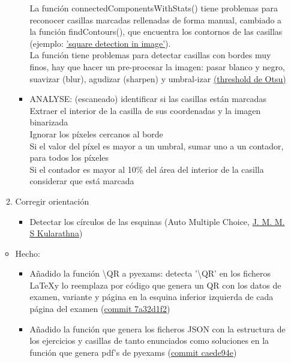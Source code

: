 \begin{itemize}
\begin{enumerate}
\begin{itemize}
            La función connectedComponentsWithStats() tiene problemas para reconocer casillas marcadas rellenadas de forma manual, cambiado a la función findContours(), que encuentra los contornos de las casillas (ejemplo: \href{https://stackoverflow.com/questions/55169645/square-detection-in-image}{'square detection in image'}). \\
            La función tiene problemas para detectar casillas con bordes muy finos, hay que hacer un pre-procesar la imagen: pasar blanco y negro, suavizar (blur), agudizar (sharpen) y umbral-izar \href{https://docs.opencv.org/4.x/d7/d4d/tutorial_py_thresholding.html}{(threshold de Otsu)}
            \item ANALYSE: (escaneado) identificar si las casillas están marcadas \\
            Extraer el interior de la casilla de sus coordenadas y la imagen binarizada \\
            Ignorar los píxeles cercanos al borde \\
            Si el valor del píxel es mayor a un umbral, sumar uno a un contador, para todos los píxeles \\
            Si el contador es mayor al 10\% del área del interior de la casilla considerar que está marcada
        \end{itemize}
        \item Corregir orientación
        \begin{itemize}
            \item Detectar los círculos de las esquinas (Auto Multiple Choice, \href{https://dl.ucsc.cmb.ac.lk/jspui/bitstream/123456789/4522/1/2013\%20MCS\%20082.pdf}{J. M. M. S Kularathna})
        \end{itemize}
    \end{enumerate}
    \begin{itemize}
        \item Hecho:
        \begin{itemize}
            \item Añadido la función \textbackslash{}QR a pyexams: detecta '\textbackslash{}QR' en los ficheros \LaTeX y lo reemplaza por código que genera un QR con los datos de examen, variante y página en la esquina inferior izquierda de cada página del examen (\href{https://framagit.org/pang/pyexams/-/commit/7a32d1f2a68f441a0100cf344400e2952eedd6d1}{commit 7a32d1f2})
            \item Añadido la función que genera los ficheros JSON con la estructura de los ejercicios y casillas de tanto enunciados como soluciones en la función que genera pdf's de pyexams (\href{https://framagit.org/pang/pyexams/-/commit/caede94e517b2ff57f25c6e9fee53735fe0edae2}{commit caede94e})

\end{itemize}
\end{itemize}
\end{itemize}
